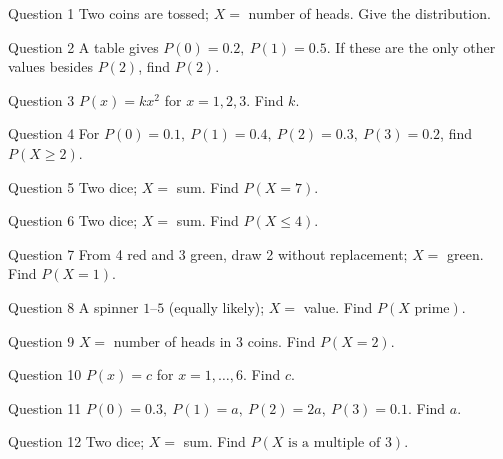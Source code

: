 \documentclass[11pt]{article}
\begin{document}
\begin{qbox}{Question 1}
Two coins are tossed; $X=$ number of heads. Give the distribution.\workspace{2.4cm}
\end{qbox}

\begin{qbox}{Question 2}
A table gives $P(0)=0.2,\ P(1)=0.5$. If these are the only other values besides $P(2)$, find $P(2)$.\workspace{2.4cm}
\end{qbox}

\begin{qbox}{Question 3}
$P(x)=kx^2$ for $x=1,2,3$. Find $k$.\workspace{2.4cm}
\end{qbox}

\begin{qbox}{Question 4}
For $P(0)=0.1,\ P(1)=0.4,\ P(2)=0.3,\ P(3)=0.2$, find $P(X\ge2)$.\workspace{2.4cm}
\end{qbox}

\begin{qbox}{Question 5}
Two dice; $X=$ sum. Find $P(X=7)$.\workspace{2.4cm}
\end{qbox}

\begin{qbox}{Question 6}
Two dice; $X=$ sum. Find $P(X\le4)$.\workspace{2.4cm}
\end{qbox}

\begin{qbox}{Question 7}
From 4 red and 3 green, draw 2 without replacement; $X=$ green. Find $P(X=1)$.\workspace{2.4cm}
\end{qbox}

\begin{qbox}{Question 8}
A spinner $1$--$5$ (equally likely); $X=$ value. Find $P(X\text{ prime})$.\workspace{2.4cm}
\end{qbox}

\begin{qbox}{Question 9}
$X=$ number of heads in 3 coins. Find $P(X=2)$.\workspace{2.4cm}
\end{qbox}

\begin{qbox}{Question 10}
$P(x)=c$ for $x=1,\dots,6$. Find $c$.\workspace{2.4cm}
\end{qbox}

\begin{qbox}{Question 11}
$P(0)=0.3,\ P(1)=a,\ P(2)=2a,\ P(3)=0.1$. Find $a$.\workspace{2.4cm}
\end{qbox}

\begin{qbox}{Question 12}
Two dice; $X=$ sum. Find $P(X\text{ is a multiple of }3)$.\workspace{2.4cm}
\end{qbox}
\end{document}

